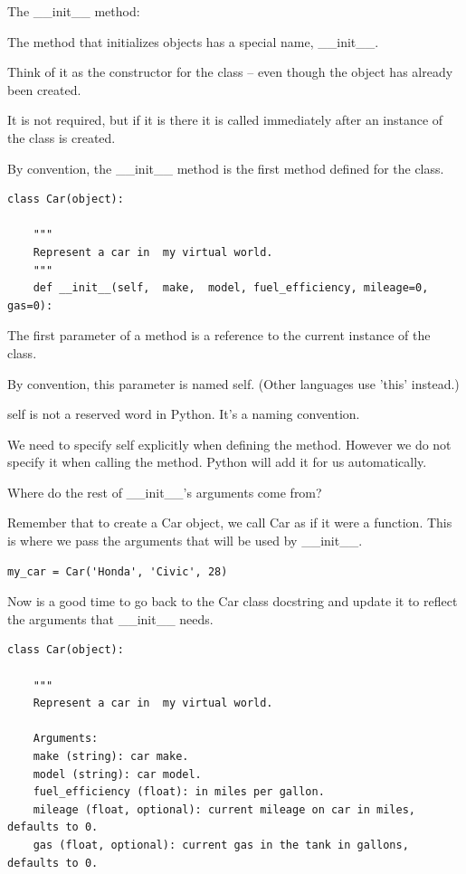 \documentclass{article}
\begin{document}
The {\_}{\_}init{\_}{\_} method:

The method that initializes objects has a special name, {\_}{\_}init{\_}{\_}.

Think of it as the constructor for the class – even though the object has already been created.

It is not required, but if it is there it is called immediately after an instance of the class is created.

By convention, the {\_}{\_}init{\_}{\_} method is the first method defined for the class.

\begin{lstlisting}
class Car(object):
   
    """
    Represent a car in  my virtual world.
    """
    def __init__(self,  make,  model, fuel_efficiency, mileage=0, gas=0):
\end{lstlisting}

The first parameter of a method is a reference to the current instance of the class. 

By convention, this parameter is named self. (Other languages use 'this' instead.)

self is not a reserved word in Python.  It’s a naming convention.

We need to specify self explicitly when defining the method.  However we do  not specify it when calling the method.  Python will add it for us automatically.

Where do the rest of {\_}{\_}init{\_}{\_}’s arguments come from?

Remember that to create a  Car object, we call Car as if it were a function.  This is where we pass the arguments that will be used by {\_}{\_}init{\_}{\_}.

\begin{lstlisting}
my_car = Car('Honda', 'Civic', 28)
\end{lstlisting}

Now is a good time to go back to the Car class docstring and update it to reflect the arguments that {\_}{\_}init{\_}{\_} needs.

\begin{lstlisting}
class Car(object):
 
    """
    Represent a car in  my virtual world.
 
    Arguments:
    make (string): car make.
    model (string): car model.
    fuel_efficiency (float): in miles per gallon.
    mileage (float, optional): current mileage on car in miles, defaults to 0.
    gas (float, optional): current gas in the tank in gallons, defaults to 0.   
\end{lstlisting}
\end{document}
